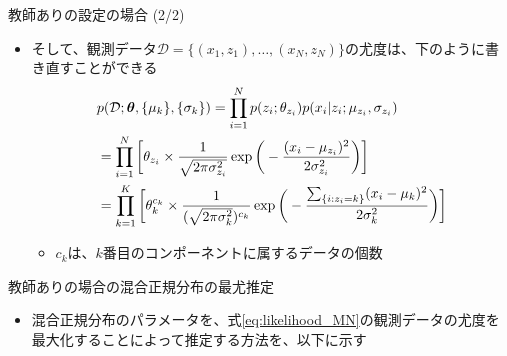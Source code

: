 \documentclass[aspectratio=169,unicode,dvipdfmx,14pt]{beamer}
\begin{document}
\begin{frame}{教師ありの設定の場合 (2/2)}
\begin{itemize}
\item そして、観測データ$\mathcal{D} = \{ (x_1,z_1), \ldots, (x_N,z_N) \}$の尤度は、下のように書き直すことができる
\vspace{-.1in}
\begin{align}
& p(\mathcal{D};\bm{\theta}, \{ \mu_k \}, \{ \sigma_k \} )
= \prod_{i=1}^N p(z_i ; \theta_{z_i}) p(x_i | z_i ; \mu_{z_i}, \sigma_{z_i})
\notag \\ &
= \prod_{i=1}^N \bigg[ \theta_{z_i} \times \frac{1}{\sqrt{2\pi\sigma_{z_i}^2}}\exp\bigg( - \frac{(x_i - \mu_{z_i})^2}{2\sigma_{z_i}^2} \bigg) \bigg]
\notag \\ &
= \prod_{k=1}^K \bigg[ \theta_k^{c_k} \times \frac{1}{ (\sqrt{2\pi\sigma_k^2} )^{c_k}} 
\exp\bigg( - \frac{ \sum_{ \{ i : z_i = k \} } (x_i - \mu_k)^2 }{2\sigma_k^2} \bigg) \bigg]
\label{eq:likelihood_MN}
\end{align}
\vspace{-.15in}
\begin{itemize}
\item $c_k$は、$k$番目のコンポーネントに属するデータの個数
\end{itemize}
\end{itemize}
\end{frame}


\begin{frame}{教師ありの場合の混合正規分布の最尤推定}
\begin{itemize}
\item 混合正規分布のパラメータを、式\eqref{eq:likelihood_MN}の観測データの尤度を最大化することによって推定する方法を、以下に示す
\end{itemize}
\end{frame}
\end{document}
